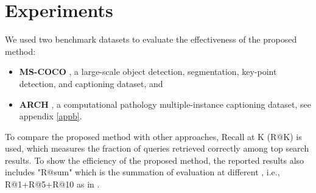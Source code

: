 \documentclass{midl}
\begin{document}
\section{Experiments}
We used two benchmark datasets to evaluate the effectiveness of the proposed method:
\begin{itemize}
    \item \textbf{MS-COCO} \cite{lin2014microsoft}, a large-scale object detection, segmentation, key-point detection, and captioning dataset, and 
    \item \textbf{ARCH} \cite{gamper2021multiple},  a computational pathology multiple-instance captioning dataset, see appendix \ref{appb}.
    \end{itemize}
    To compare the proposed method with other approaches, Recall at K (R@K) is used, which measures the fraction of queries retrieved correctly among top  search results\cite{chen2020imram,lee2018stacked}. To show the efficiency of the proposed method, the reported results also includes "R@sum" which is the summation of evaluation at different , i.e., R@1+R@5+R@10 as in \cite{huang2017instance}.
\end{document}
